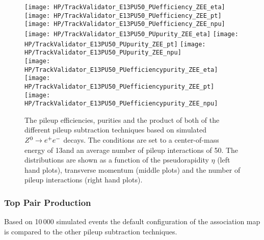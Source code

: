 \begin{figure}[!h]
  \centering
  \texttt{[image: HP/TrackValidator\_E13PU50\_PUefficiency\_ZEE\_eta]}
  \texttt{[image: HP/TrackValidator\_E13PU50\_PUefficiency\_ZEE\_pt]}
  \texttt{[image: HP/TrackValidator\_E13PU50\_PUefficiency\_ZEE\_npu]}
   \\
  \texttt{[image: HP/TrackValidator\_E13PU50\_PUpurity\_ZEE\_eta]}
  \texttt{[image: HP/TrackValidator\_E13PU50\_PUpurity\_ZEE\_pt]}
  \texttt{[image: HP/TrackValidator\_E13PU50\_PUpurity\_ZEE\_npu]}
   \\
  \texttt{[image: HP/TrackValidator\_E13PU50\_PUefficiencypurity\_ZEE\_eta]}
  \texttt{[image: HP/TrackValidator\_E13PU50\_PUefficiencypurity\_ZEE\_pt]}
  \texttt{[image: HP/TrackValidator\_E13PU50\_PUefficiencypurity\_ZEE\_npu]}
  \caption[Pileup efficiencies, purities and their product of the different pileup subtraction techniques based $\Zz\rightarrow\EE$ decays with 13\TeV and $\left<PU\right>=50$]{The pileup efficiencies, purities and the product of both of the different pileup subtraction techniques based on simulated $\Zz\rightarrow\EE$ decays. The conditions are set to a center-of-mass energy of 13\TeV and an average number of pileup interactions of 50. The distributions are shown as a function of the pseudorapidity $\eta$ (left hand plots), transverse momentum (middle plots) and the number of pileup interactions (right hand plots).}
\end{figure}
\clearpage

\subsubsection{Top Pair Production}

Based on 10\,000 simulated \ttbar events the default configuration of the association map is compared to the other pileup subtraction techniques.


